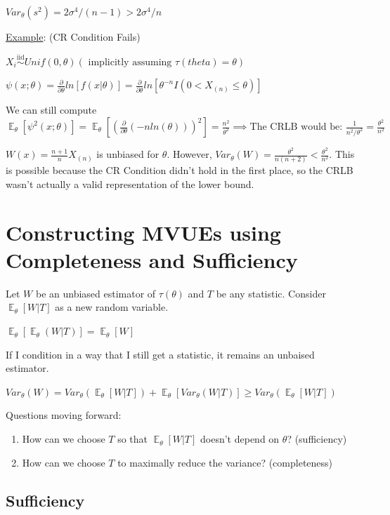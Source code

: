\documentclass{article}
\DeclareMathOperator{\EX}{\mathbb{E}} %
\newcommand{\iiddist}{\overset{\mathrm{iid}}{\sim}}
\begin{document}
$Var_{\theta}(s^2) = 2\sigma^4/(n-1) > 2\sigma^4/n$


\underline{Example}: (CR Condition Fails)

$X_i \iiddist Unif(0, \theta) (\text{ implicitly assuming } \tau(theta) = \theta)$

$\psi(x;\theta) = \frac{\partial}{\partial\theta}ln[f(x|\theta)] = \frac{\partial}{\partial\theta}ln[\theta^{-n}I(0 < X_{(n)} \le \theta)]$

We can still compute $\EX_{\theta}[\psi^2(x;\theta)] = \EX_{\theta}[(\frac{\partial}{\partial\theta}(-n ln(\theta)))^2] = \frac{n^2}{\theta^2} \implies \text{The CRLB would be: } \frac{1}{n^2/\theta^2} = \frac{\theta^2}{n^2}$

$W(x) = \frac{n+1}{n}X_{(n)}$ is unbiased for $\theta$. However, $Var_{\theta}(W) = \frac{\theta^2}{n(n+2)} < \frac{\theta^2}{n^2}$. This is possible because the CR Condition didn't hold in the first place, so the CRLB wasn't actually a valid representation of the lower bound. 


\section{Constructing MVUEs using Completeness and Sufficiency}

Let $W$ be an unbiased estimator of $\tau(\theta)$ and $T$ be any statistic. Consider $\EX_{\theta}[W|T]$ as a new random variable.

$\EX_{\theta}[\EX_{\theta}(W|T)] = \EX_{\theta}[W]$

If I condition in a way that I still get a statistic, it remains an unbaised estimator.

$Var_{\theta}(W) = Var_{\theta}(\EX_{\theta}[W|T]) + \EX_{\theta}[Var_{\theta}(W|T)] \ge Var_{\theta}(\EX_{\theta}[W|T])$

Questions moving forward:
\begin{enumerate}
    \item How can we choose $T$ so that $\EX_{\theta}[W|T]$ doesn't depend on $\theta$? (sufficiency)
    \item How can we choose $T$ to maximally reduce the variance? (completeness)
\end{enumerate}



\subsection{Sufficiency}
\end{document}

